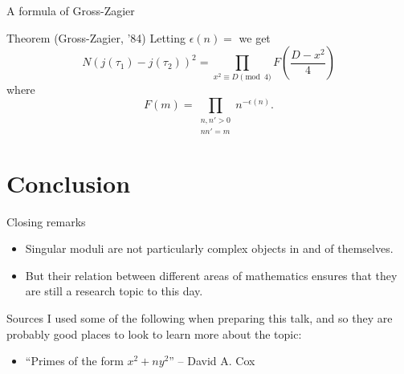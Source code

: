 \documentclass{beamer}
\begin{document}
\begin{frame}{A formula of Gross-Zagier}
\begin{block}{Theorem (Gross-Zagier, '84)}
Letting $\epsilon(n) = $ we get
\[
N(j(\tau_1) - j(\tau_2))^2 = \prod_{x^2 \equiv D \pmod{4}} F\left(\frac{D-x^2}{4}\right)
\]
where
\[
F(m) = \prod_{\substack{n,n' > 0\\ nn' = m}} n^{-\epsilon(n)}.
\]
\end{block}
\end{frame}

\section{Conclusion}
\begin{frame}{Closing remarks}
\begin{itemize}
\item Singular moduli are not particularly complex objects in and of themselves.
\pause \item But their relation between different areas of mathematics ensures that they are still a research topic to this day.
\end{itemize}
\end{frame}

\begin{frame}{Sources}
I used some of the following when preparing this talk, and so they are probably good places to look to learn more about the topic:
\begin{itemize}
\item ``Primes of the form $x^2 + ny^2$'' -- David A. Cox
\end{itemize}
\end{frame}
\end{document}
